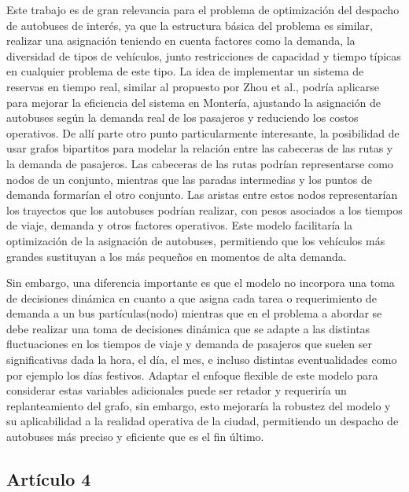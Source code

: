 \documentclass[preprint,11pt]{elsarticle}
\begin{document}
Este trabajo es de gran relevancia para el problema de optimización del despacho de autobuses de interés, ya que la estructura básica del problema es similar, realizar una asignación teniendo en cuenta factores como la demanda, la diversidad de tipos de vehículos, junto restricciones de capacidad y tiempo típicas en cualquier problema de este tipo. La idea de implementar un sistema de reservas en tiempo real, similar al propuesto por Zhou et al., podría aplicarse para mejorar la eficiencia del sistema en Montería, ajustando la asignación de autobuses según la demanda real de los pasajeros y reduciendo los costos operativos. De allí parte otro punto particularmente interesante, la posibilidad de usar grafos bipartitos para modelar la relación entre las cabeceras de las rutas y la demanda de pasajeros. Las cabeceras de las rutas podrían representarse como nodos de un conjunto, mientras que las paradas intermedias y los puntos de demanda formarían el otro conjunto. Las aristas entre estos nodos representarían los trayectos que los autobuses podrían realizar, con pesos asociados a los tiempos de viaje, demanda y otros factores operativos. Este modelo facilitaría la optimización de la asignación de autobuses, permitiendo que los vehículos más grandes sustituyan a los más pequeños en momentos de alta demanda.

Sin embargo, una diferencia importante es que el modelo no incorpora una toma de decisiones dinámica en cuanto a que asigna cada tarea o requerimiento de demanda a un bus partículas(nodo) mientras que en el problema a abordar se debe realizar una toma de decisiones dinámica que se adapte a las distintas fluctuaciones en los tiempos de viaje y demanda de pasajeros que suelen ser significativas dada la hora, el día, el mes, e incluso distintas eventualidades como por ejemplo los días festivos. Adaptar el enfoque flexible de este modelo para considerar estas variables adicionales puede ser retador y requeriría un replanteamiento del grafo, sin embargo, esto mejoraría la robustez del modelo y su aplicabilidad a la realidad operativa de la ciudad, permitiendo un despacho de autobuses más preciso y eficiente que es el fin último.

\subsection*{Artículo 4}
\end{document}
